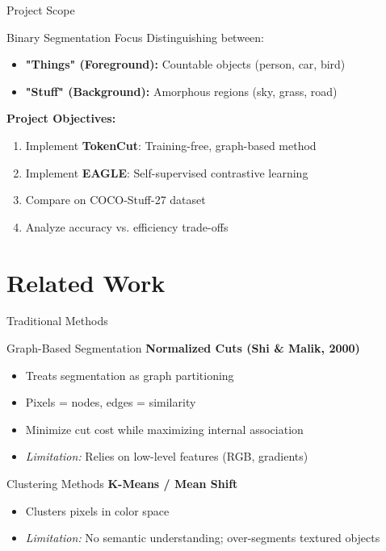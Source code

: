 \documentclass[aspectratio=169]{beamer}
\begin{document}
\begin{frame}{Project Scope}
\begin{block}{Binary Segmentation Focus}
Distinguishing between:
\begin{itemize}
    \item \textbf{"Things" (Foreground):} Countable objects (person, car, bird)
    \item \textbf{"Stuff" (Background):} Amorphous regions (sky, grass, road)
\end{itemize}
\end{block}
\vspace{0.5cm}
\textbf{Project Objectives:}
\begin{enumerate}
    \item Implement \textbf{TokenCut}: Training-free, graph-based method
    \item Implement \textbf{EAGLE}: Self-supervised contrastive learning
    \item Compare on COCO-Stuff-27 dataset
    \item Analyze accuracy vs. efficiency trade-offs
\end{enumerate}
\end{frame}
\section{Related Work}
\begin{frame}{Traditional Methods}
\begin{block}{Graph-Based Segmentation}
\textbf{Normalized Cuts (Shi \& Malik, 2000)}
\begin{itemize}
    \item Treats segmentation as graph partitioning
    \item Pixels = nodes, edges = similarity
    \item Minimize cut cost while maximizing internal association
    \item \textit{Limitation:} Relies on low-level features (RGB, gradients)
\end{itemize}
\end{block}
\vspace{0.3cm}
\begin{block}{Clustering Methods}
\textbf{K-Means / Mean Shift}
\begin{itemize}
    \item Clusters pixels in color space
    \item \textit{Limitation:} No semantic understanding; over-segments textured objects
\end{itemize}
\end{block}
\end{frame}
\end{document}
